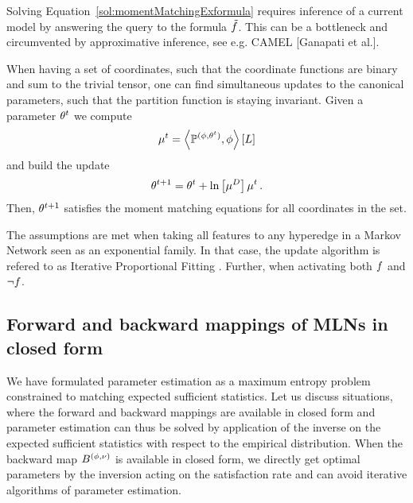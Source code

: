 Solving Equation~\ref{sol:momentMatchingExformula} requires inference of a current model by answering the query to the formula $\tilde{f}$.
This can be a bottleneck and circumvented by approximative inference, see e.g. CAMEL [Ganapati et al.].



\begin{remark}
	When having a set of coordinates, such that the coordinate functions are binary and sum to the trivial tensor, one can find simultaneous updates to the canonical parameters, such that the partition function is staying invariant.
	Given a parameter $\theta^t$ we compute
		\[ \mu^t = \left\langle \mathbb{P}^{(\phi,\theta^t)}, \phi\right\rangle \left[ L \right] \]
	and build the update
		\[ \theta^{t+1} = \theta^t + \ln \left[ \mu^{D} \right]{\mu^t} \, . \]
	Then, $\theta^{t+1}$ satisfies the moment matching equations for all coordinates in the set.
	
	
	The assumptions are met when taking all features to any hyperedge in a Markov Network seen as an exponential family.
	In that case, the update algorithm is refered to as  Iterative Proportional Fitting \cite{wainwright_graphical_2008}.
	Further, when activating both $f$ and $\lnot f$.
\end{remark}


\subsection{Forward and backward mappings of MLNs in closed form}


We have formulated parameter estimation as a maximum entropy problem constrained to matching expected sufficient statistics.
Let us discuss situations, where the forward and backward mappings are available in closed form and parameter estimation can thus be solved by application of the inverse on the expected sufficient statistics with respect to the empirical distribution.
When the backward map $B^{(\phi,\nu)}$ is available in closed form, we directly get optimal parameters by the inversion acting on the satisfaction rate and can avoid iterative algorithms of parameter estimation.

